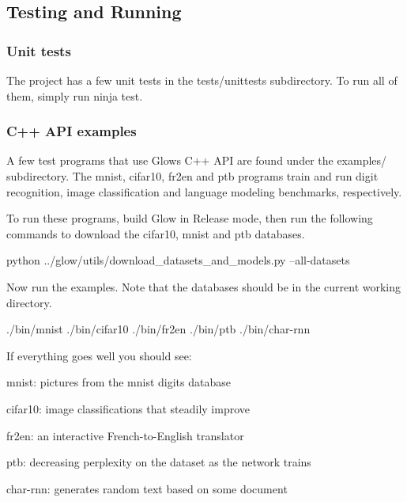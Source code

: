 \subsection*{Testing and Running}

\subsubsection*{Unit tests}

The project has a few unit tests in the tests/unittests subdirectory. To run all of them, simply run {\ttfamily ninja test}.

\subsubsection*{C++ A\+PI examples}

A few test programs that use Glow\textquotesingle{}s C++ A\+PI are found under the {\ttfamily examples/} subdirectory. The {\ttfamily mnist}, {\ttfamily cifar10}, {\ttfamily fr2en} and {\ttfamily ptb} programs train and run digit recognition, image classification and language modeling benchmarks, respectively.

To run these programs, build Glow in Release mode, then run the following commands to download the cifar10, mnist and ptb databases.


\begin{DoxyCode}
python ../glow/utils/download\_datasets\_and\_models.py --all-datasets
\end{DoxyCode}


Now run the examples. Note that the databases should be in the current working directory.


\begin{DoxyCode}
./bin/mnist
./bin/cifar10
./bin/fr2en
./bin/ptb
./bin/char-rnn
\end{DoxyCode}


If everything goes well you should see\+:
\begin{DoxyItemize}
\item {\ttfamily mnist}\+: pictures from the mnist digits database
\item {\ttfamily cifar10}\+: image classifications that steadily improve
\item {\ttfamily fr2en}\+: an interactive French-\/to-\/\+English translator
\item {\ttfamily ptb}\+: decreasing perplexity on the dataset as the network trains
\item {\ttfamily char-\/rnn}\+: generates random text based on some document
\end{DoxyItemize}

